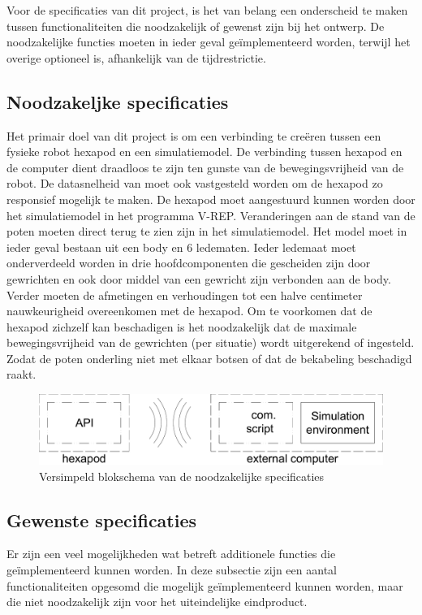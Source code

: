 \documentclass[10pt,a4paper]{article}
\begin{document}
Voor de specificaties van dit project, is het van belang een onderscheid te maken tussen functionaliteiten die noodzakelijk of gewenst zijn bij het ontwerp. De noodzakelijke functies moeten in ieder geval ge\"implementeerd worden, terwijl het overige optioneel is, afhankelijk van de tijdrestrictie.

\subsection{Noodzakeljke specificaties}
Het primair doel van dit project is om een verbinding te cre\"eren tussen een fysieke robot hexapod en een simulatiemodel. De verbinding tussen hexapod en de computer dient draadloos te zijn ten gunste van de bewegingsvrijheid van de robot. De datasnelheid van moet ook vastgesteld worden om de hexapod zo responsief mogelijk te maken. De hexapod moet aangestuurd kunnen worden door het simulatiemodel in het programma V-REP. Veranderingen aan de stand van de poten moeten direct terug te zien zijn in het simulatiemodel. Het model moet in ieder geval bestaan uit een body en 6 ledematen. Ieder ledemaat moet onderverdeeld worden in drie hoofdcomponenten die gescheiden zijn door gewrichten en ook door middel van een gewricht zijn verbonden aan de body. Verder moeten de afmetingen en verhoudingen tot een halve centimeter nauwkeurigheid overeenkomen met de hexapod.
Om te voorkomen dat de hexapod zichzelf kan beschadigen is het noodzakelijk dat de maximale bewegingsvrijheid van de gewrichten (per situatie) wordt uitgerekend of ingesteld. Zodat de poten onderling niet met elkaar botsen of dat de bekabeling beschadigd raakt.

\begin{figure}[h]
    \centering
    \includegraphics[width=1\textwidth]{blockschematic-simple}
    \caption{Versimpeld blokschema van de noodzakelijke specificaties}
    \label{fig:blockschematic-simple}
\end{figure}

\subsection{Gewenste specificaties}
Er zijn een veel mogelijkheden wat betreft additionele functies die ge\"implementeerd kunnen worden. In deze subsectie zijn een aantal functionaliteiten opgesomd die mogelijk ge\"implementeerd kunnen worden, maar die niet noodzakelijk zijn voor het uiteindelijke eindproduct.
\end{document}
